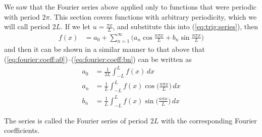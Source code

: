We saw that the Fourier series above applied only to functions that were periodic with period $2\pi$.  This section covers functions with arbitrary periodicity, which we will call period $2L$.   If we let  $u=\frac{\pi x}{L}$, and substitute this into (\ref{eq:trig:series}), then 
% 
\begin{align}
f(x) & = a_0 + \sum_{n=1}^{\infty} \biggl( a_n \cos \frac{n\pi x}{L} + b_n \sin \frac{n \pi x}{L} \biggr)  \label{eq:FS:period:2L}
\end{align}
and then it can be shown in a similar manner to that above that (\ref{eq:fourier:coeff:a0})--(\ref{eq:fourier:coeff:bn}) can be written as
%
\begin{align}
a_0 & = \frac{1}{2L} \int_{-L}^L f(x) \, dx \label{eq:coeff:period:2L:a0} \\
a_n & = \frac{1}{L} \int_{-L}^{L} f(x) \cos \biggl( \frac{n\pi x}{L} \biggr) \, dx 
\label{eq:coeff:period:2L:an}\\
b_n & =  \frac{1}{L} \int_{-L}^{L} f(x) \sin \biggl( \frac{n\pi x}{L} \biggr) \, dx
\label{eq:coeff:period:2L:bn}
\end{align}

The series is called the Fourier series of period $2L$ with the corresponding Fourier coefficients.  


